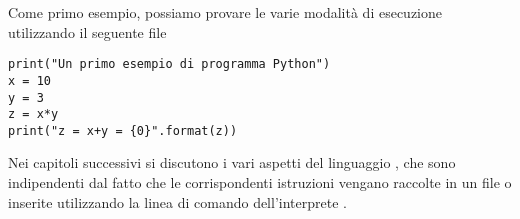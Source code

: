 Come primo esempio, possiamo provare le varie modalit\`a di esecuzione
utilizzando il seguente file 
\begin{verbatim}
print("Un primo esempio di programma Python")
x = 10
y = 3
z = x*y
print("z = x+y = {0}".format(z))
\end{verbatim}

Nei capitoli successivi si discutono i vari aspetti del linguaggio \python, che
sono indipendenti dal fatto che le corrispondenti istruzioni vengano raccolte in
un file  o inserite utilizzando la linea di comando dell'interprete
\python.

